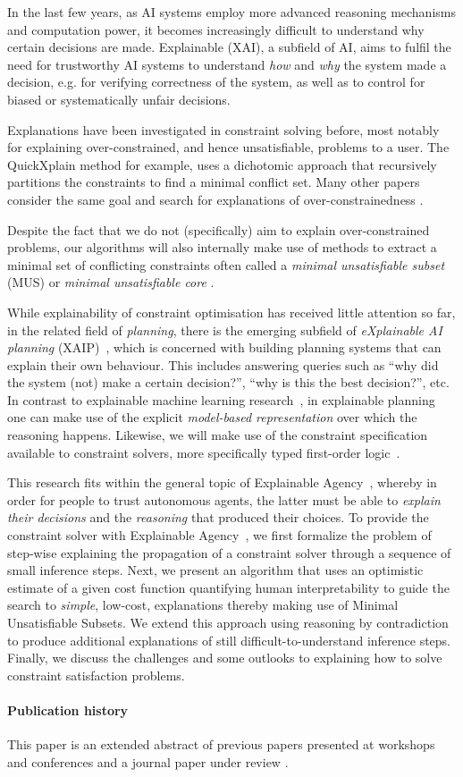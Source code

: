 In the last few years, as AI systems employ more advanced reasoning mechanisms and computation power, it becomes increasingly difficult to understand why certain decisions are made.
Explainable (XAI), a subfield of AI, aims to fulfil the need for trustworthy AI systems to understand \emph{how} and \emph{why} the system made a decision, e.g. for verifying correctness of the system, as well as to control for biased or systematically unfair decisions.

Explanations have been investigated in constraint solving before, most notably for explaining over-constrained, and hence unsatisfiable, problems to a user.
The QuickXplain method \cite{junker2001quickxplain} for example, uses a dichotomic approach that recursively partitions the constraints to find a minimal conflict set.
Many other papers consider the same goal and search for explanations of over-constrainedness \cite{leo2017debugging,zeighami2018towards}.

Despite the fact that we do not (specifically) aim to explain over-constrained problems, our algorithms will also internally make use of methods to extract a minimal set of conflicting constraints often called a \emph{minimal unsatisfiable subset} (MUS) or \emph{minimal unsatisfiable core} \cite{marques2010minimal}.

While explainability of constraint optimisation has received little attention so far, in the related field of \textit{planning}, there is the emerging subfield of \textit{eXplainable AI planning} (XAIP)~\cite{fox2017explainable}, which is concerned with building planning systems that can explain their own behaviour.
This includes answering queries such as ``why did the system (not) make a certain decision?'', ``why is this the best decision?'', etc. In contrast to explainable machine learning research~\cite{guidotti2018survey}, in explainable planning one can make use of the explicit \textit{model-based representation} over which the reasoning happens.
Likewise, we will make use of the constraint specification available to constraint solvers, more specifically typed first-order logic~\cite{atcl/Wittocx13}.

This research fits within the general topic of Explainable Agency~\cite{langley2017explainable}, whereby in order for people to trust autonomous agents, the latter must be able to \textit{explain their decisions} and the \textit{reasoning} that produced their choices.
To provide the constraint solver with Explainable Agency~\cite{langley2017explainable}, we first formalize the problem of step-wise explaining the propagation of a constraint solver through a sequence of small inference steps.
Next, we present an algorithm that uses an optimistic estimate of a given cost function quantifying human interpretability to guide the search to \textit{simple}, low-cost, explanations thereby making use of Minimal Unsatisfiable Subsets.
We extend this approach using reasoning by contradiction to produce additional explanations of still difficult-to-understand inference steps.
Finally, we discuss the challenges and some outlooks to explaining how to solve constraint satisfaction problems.

\paragraph*{Publication history} This paper is an extended abstract of previous papers presented at workshops and conferences \cite{claesuser,DBLP:conf/bnaic/ClaesBCGG19,ecai/BogaertsGCG20} and a journal paper under review \cite{bogaerts2020framework}.